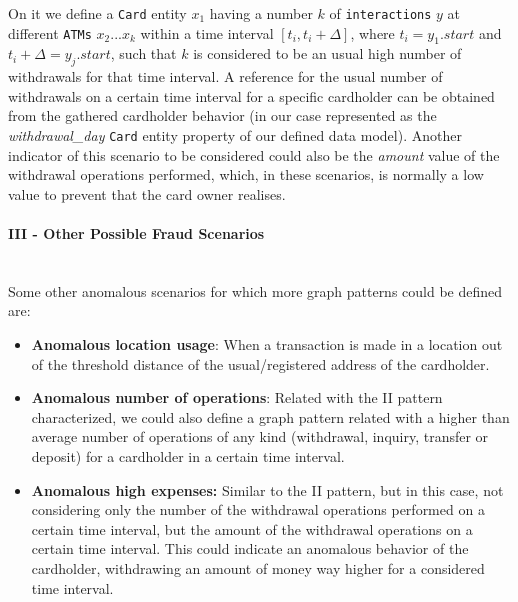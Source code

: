 On it we define a \texttt{Card} entity $x_1$ having a number $k$ of \texttt{interactions} $y$ at different \texttt{ATMs} $x_2 ... x_k$ within a time interval $[t_i, t_i + \Delta]$, where $t_i = y_1.\textit{start}$ and $t_i + \Delta = y_j.\textit{start}$, such that $k$ is considered to be an usual high number of withdrawals for that time interval. A reference for the usual number of withdrawals on a certain time interval for a specific cardholder can be obtained from the gathered cardholder behavior (in our case represented as the \emph{withdrawal\_day} \texttt{Card} entity property of our defined data model).
Another indicator of this scenario to be considered could also be the \emph{amount} value of the withdrawal operations performed, which, in these scenarios, is normally a low value to prevent that the card owner realises.

\paragraph{III - Other Possible Fraud Scenarios\\\\}

Some other anomalous scenarios for which more graph patterns could be defined are:
\begin{itemize}
    \item \textbf{Anomalous location usage}: When a transaction is made in a location out of the threshold distance of the usual/registered address of the cardholder.
    \item \textbf{Anomalous number of operations}: Related with the II pattern characterized, we could also define a graph pattern related with a higher than average number of operations of any kind (withdrawal, inquiry, transfer or deposit) for a cardholder in a certain time interval.
    \item \textbf{Anomalous high expenses:} Similar to the II pattern, but in this case, not considering only the number of the withdrawal operations performed on a certain time interval, but the amount of the withdrawal operations on a certain time interval. This could indicate an anomalous behavior of the cardholder, withdrawing an amount of money way higher for a considered time interval.
\end{itemize}

%



%
%
%
